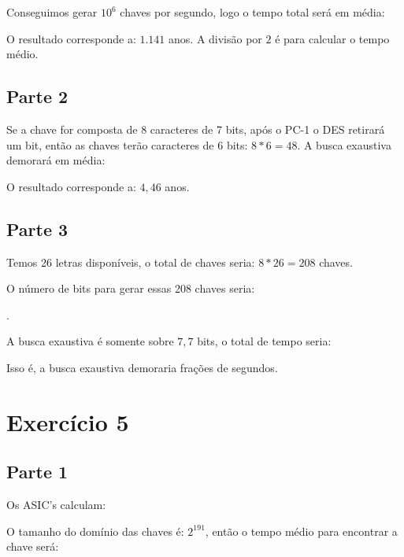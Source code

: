\documentclass[a4paper]{article}
\begin{document}
Conseguimos gerar $10^6$ chaves por segundo, logo o tempo total será em média:


O resultado corresponde a: $1.141$ anos. A divisão por $2$ é para calcular o tempo médio.

\subsection{Parte 2}

Se a chave for composta de 8 caracteres de 7 bits, após o PC-1 o DES retirará um bit, então as chaves terão caracteres de 6 bits: $8 * 6 = 48$. A busca exaustiva demorará em média:


O resultado corresponde a: $4,46$ anos.

\subsection{Parte 3}

Temos 26 letras disponíveis, o total de chaves seria: $8 * 26 = 208$ chaves.

O número de bits para gerar essas 208 chaves seria:

.

A busca exaustiva é somente sobre $7,7$ bits, o total de tempo seria:


Isso é, a busca exaustiva demoraria frações de segundos.

\section{Exercício 5}\label{sec:Ex5}

\subsection{Parte 1}

Os ASIC's calculam:


O tamanho do domínio das chaves é: $2^{191}$, então o tempo médio para encontrar a chave será:
\end{document}
